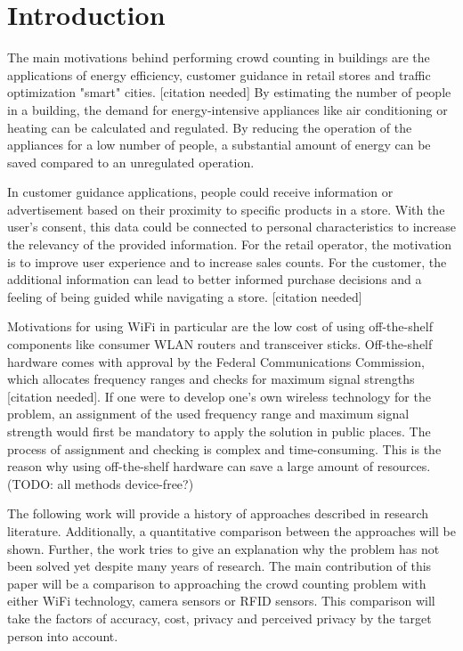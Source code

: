 \documentclass[conference]{IEEEtran}
\begin{document}
\section{Introduction}
The main motivations behind performing crowd counting in buildings are the applications of energy efficiency, customer guidance in retail stores and traffic optimization "smart" cities. [citation needed] By estimating the number of people in a building, the demand for energy-intensive appliances like air conditioning or heating can be calculated and regulated. By reducing the operation of the appliances for a low number of people, a substantial amount of energy can be saved compared to an unregulated operation. 
\par
In customer guidance applications, people could receive information or advertisement based on their proximity to specific products in a store. With the user's consent, this data could be connected to personal characteristics to increase the relevancy of the provided information. For the retail operator, the motivation is to improve user experience and to increase sales counts. For the customer, the additional information can lead to better informed purchase decisions and a feeling of being guided while navigating a store. [citation needed]
\par
Motivations for using WiFi in particular are the low cost of using off-the-shelf components like consumer WLAN routers and transceiver sticks. Off-the-shelf hardware comes with approval by the Federal Communications Commission, which allocates frequency ranges and checks for maximum signal strengths [citation needed]. If one were to develop one's own wireless technology for the problem, an assignment of the used frequency range and maximum signal strength would first be mandatory to apply the solution in public places. The process of assignment and checking is complex and time-consuming. This is the reason why using off-the-shelf hardware can save a large amount of resources. (TODO: all methods device-free?)
\par
The following work will provide a history of approaches described in research literature. Additionally, a quantitative comparison between the approaches will be shown. Further, the work tries to give an explanation why the problem has not been solved yet despite many years of research. The main contribution of this paper will be a comparison to approaching the crowd counting problem with either WiFi technology, camera sensors or RFID sensors. This comparison will take the factors of accuracy, cost, privacy and perceived privacy by the target person into account. 
\end{document}
